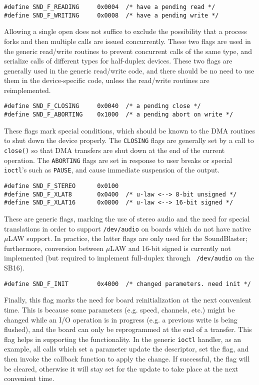 \documentclass[11pt]{article}
\begin{document}
\begin{verbatim}
#define SND_F_READING     0x0004  /* have a pending read */
#define SND_F_WRITING     0x0008  /* have a pending write */
\end{verbatim}
Allowing a single open does not suffice to exclude the possibility
that a process forks and then multiple calls are issued concurrently.
These two flags are used in the generic read/write routines to
prevent concurrent calls of the same type, and serialize calls of
different types for half-duplex devices.  These two flags are
generally used in the generic read/write code, and there should be
no need to use them in the device-specific code, unless the read/write
routines are reimplemented.

\begin{verbatim}
#define SND_F_CLOSING     0x0040  /* a pending close */
#define SND_F_ABORTING    0x1000  /* a pending abort on write */
\end{verbatim}
These flags mark special conditions, which should be known to the
DMA routines to shut down the device properly. The {\tt CLOSING} flags
are generally set by a call to {\tt close()} so that DMA transfers are
shut down at the end of the current operation. The {\tt ABORTING}
flags are set in response to user breaks or special {\tt ioctl}'s
such as {\tt PAUSE}, and cause immediate suspension of the output.

\begin{verbatim}
#define SND_F_STEREO      0x0100
#define SND_F_XLAT8       0x0400  /* u-law <--> 8-bit unsigned */
#define SND_F_XLAT16      0x0800  /* u-law <--> 16-bit signed */
\end{verbatim}
These are generic flags, marking the use of stereo audio and the
need for special translations in order to support {\tt /dev/audio}
on boards which do not have native $\mu$LAW support. In practice,
the latter flags are only used for the SoundBlaster; furthermore,
conversion between $\mu$LAW and 16-bit signed is currently not
implemented (but required to implement full-duplex through {\tt
/dev/audio} on the SB16).

\begin{verbatim}
#define SND_F_INIT        0x4000  /* changed parameters. need init */
\end{verbatim}
Finally, this flag marks the need for board reinitialization at the
next convenient time. This is because some parameters (e.g. speed,
channels, etc.) might be changed while an I/O operation is in progress
(e.g. a previous write is being flushed), and the board can only be
reprogrammed at the end of a transfer. This flag helps in supporting
the functionality. In the generic {\tt ioctl} handler, as an example,
all calls which set a parameter update the descriptor, set the flag,
and then invoke the callback function to apply the change. If successful,
the flag will be cleared, otherwise it will stay set for the update to
take place at the next convenient time.
\end{document}
